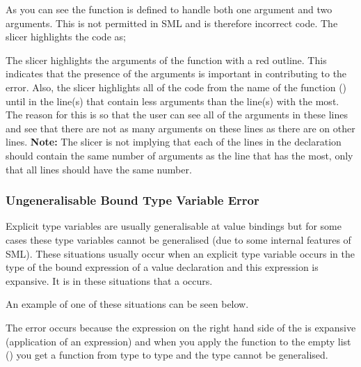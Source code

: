 \documentclass{article}
\begin{document}
\begin{itemize}
As you can see the function  is defined to handle
both one argument and two arguments. This is not permitted in SML and
is therefore incorrect code. The slicer highlights the code as;

The slicer highlights the arguments of the function with a red
outline. This indicates that the presence of the arguments is
important in contributing to the error. Also, the slicer highlights
all of the code from the name of the function ()
until \incodebody{=} in the line(s) that contain less arguments
than the line(s) with the most. The reason for this is so that the
user can see all of the arguments in these lines and see that there
are not as many arguments on these lines as there are on other lines.
\textbf{Note:} The slicer is not implying that each of the lines in
the declaration should contain the same number of arguments as the
line that has the most, only that all lines should have the same number.


\subsubsection{Ungeneralisable Bound Type Variable Error}

\subitem Explicit type variables are usually generalisable at value
bindings but for some cases these type variables cannot be generalised
(due to some internal features of SML). These situations usually occur
when an explicit type variable occurs in the type of the bound
expression of a value declaration and this expression is expansive. It is
in these situations that a  occurs.

An example of one of these situations can be seen below.


The error occurs because the expression on the right hand side of the
\incodebody{=} is expansive (application of an  expression) and when you apply the function
 to the empty list (\incodebody{[]}) you get a function
from type  to type  and the type
 cannot be generalised.


\end{itemize}
\end{document}
